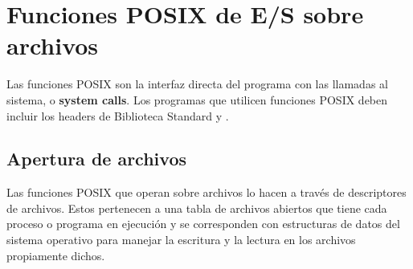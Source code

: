 % 

\section{Funciones POSIX de E/S sobre archivos}
\label{subsec:esarchivosposix}

Las funciones POSIX son la interfaz directa del programa con las llamadas al
sistema, o \textbf{system calls}. Los programas que utilicen funciones POSIX deben incluir los headers de
Biblioteca Standard  y .
 

\subsection{Apertura de archivos}
Las funciones POSIX que operan sobre archivos lo hacen
a través de descriptores de archivos. Estos pertenecen a una tabla de archivos
abiertos que tiene cada proceso o programa en ejecución y se corresponden con
estructuras de datos del sistema operativo para manejar la escritura y la
lectura en los archivos propiamente dichos.

